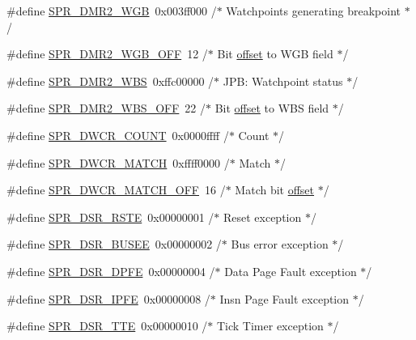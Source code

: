\begin{DoxyCompactItemize}
\item 
\#define \hyperlink{spr-defs_8h_a2afb795c1bc6908769047730c2501915}{\-S\-P\-R\-\_\-\-D\-M\-R2\-\_\-\-W\-G\-B}~0x003ff000  /$\ast$ Watchpoints generating breakpoint $\ast$/
\item 
\#define \hyperlink{spr-defs_8h_a78ed1502e767145ccb83738517c3d7af}{\-S\-P\-R\-\_\-\-D\-M\-R2\-\_\-\-W\-G\-B\-\_\-\-O\-F\-F}~12  /$\ast$ \-Bit \hyperlink{alt__flash_8h_a461f0be37c7c42bd613e22be8678818a}{offset} to \-W\-G\-B field $\ast$/
\item 
\#define \hyperlink{spr-defs_8h_a0d526e99bf9543db42f9ac000c4fb622}{\-S\-P\-R\-\_\-\-D\-M\-R2\-\_\-\-W\-B\-S}~0xffc00000  /$\ast$ J\-P\-B\-: Watchpoint status $\ast$/
\item 
\#define \hyperlink{spr-defs_8h_a3a73c7b1b89337a0def467f050b5d7da}{\-S\-P\-R\-\_\-\-D\-M\-R2\-\_\-\-W\-B\-S\-\_\-\-O\-F\-F}~22  /$\ast$ \-Bit \hyperlink{alt__flash_8h_a461f0be37c7c42bd613e22be8678818a}{offset} to \-W\-B\-S field $\ast$/
\item 
\#define \hyperlink{spr-defs_8h_a064ea19bbfcfd550d41cf29d7ec6a08d}{\-S\-P\-R\-\_\-\-D\-W\-C\-R\-\_\-\-C\-O\-U\-N\-T}~0x0000ffff  /$\ast$ Count $\ast$/
\item 
\#define \hyperlink{spr-defs_8h_a527c56cb4cdc86c3a8fdd3325a67839b}{\-S\-P\-R\-\_\-\-D\-W\-C\-R\-\_\-\-M\-A\-T\-C\-H}~0xffff0000  /$\ast$ Match $\ast$/
\item 
\#define \hyperlink{spr-defs_8h_a3148ce4a0d55efb8b2c8c1b7080442b6}{\-S\-P\-R\-\_\-\-D\-W\-C\-R\-\_\-\-M\-A\-T\-C\-H\-\_\-\-O\-F\-F}~16  /$\ast$ \-Match bit \hyperlink{alt__flash_8h_a461f0be37c7c42bd613e22be8678818a}{offset} $\ast$/
\item 
\#define \hyperlink{spr-defs_8h_ac50f48c2f3af8c497ef800e0cf8c1a9b}{\-S\-P\-R\-\_\-\-D\-S\-R\-\_\-\-R\-S\-T\-E}~0x00000001  /$\ast$ Reset exception $\ast$/
\item 
\#define \hyperlink{spr-defs_8h_a5c75d66c6e4398678e016ee28341f264}{\-S\-P\-R\-\_\-\-D\-S\-R\-\_\-\-B\-U\-S\-E\-E}~0x00000002  /$\ast$ Bus error exception $\ast$/
\item 
\#define \hyperlink{spr-defs_8h_a8f7e8369604398194a6b874e37627142}{\-S\-P\-R\-\_\-\-D\-S\-R\-\_\-\-D\-P\-F\-E}~0x00000004  /$\ast$ Data Page Fault exception $\ast$/
\item 
\#define \hyperlink{spr-defs_8h_a34b653dafe7834cfa3ae0ca2f8326e64}{\-S\-P\-R\-\_\-\-D\-S\-R\-\_\-\-I\-P\-F\-E}~0x00000008  /$\ast$ Insn Page Fault exception $\ast$/
\item 
\#define \hyperlink{spr-defs_8h_ab7f29710520dcaff833d698ba2bbbd9f}{\-S\-P\-R\-\_\-\-D\-S\-R\-\_\-\-T\-T\-E}~0x00000010  /$\ast$ Tick Timer exception $\ast$/

\end{DoxyCompactItemize}
